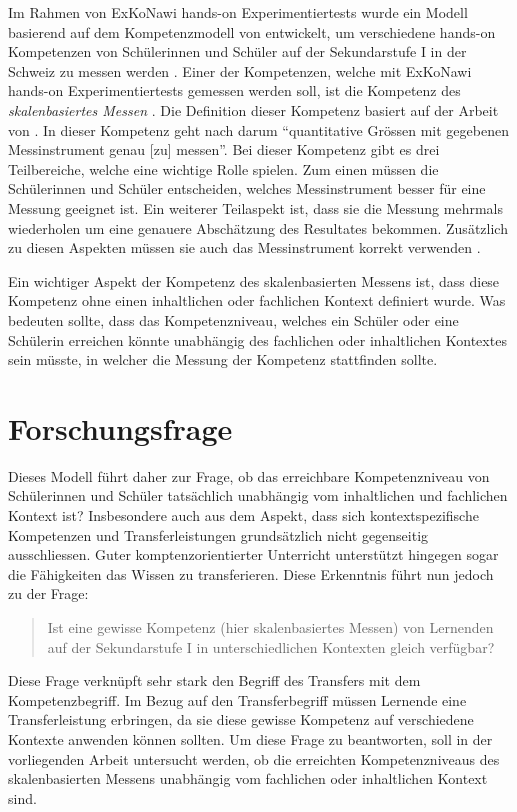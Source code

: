 Im Rahmen von ExKoNawi hands-on Experimentiertests wurde ein Modell basierend auf dem Kompetenzmodell von \citet{Gott1996} entwickelt, um verschiedene hands-on Kompetenzen von Schülerinnen und Schüler auf der Sekundarstufe I in der Schweiz zu messen werden \citep{Metzger2013}. Einer der Kompetenzen, welche mit ExKoNawi hands-on Experimentiertests gemessen werden soll, ist die Kompetenz des \textit{skalenbasiertes Messen} \citep{Gut2013a}. Die Definition dieser Kompetenz basiert auf der Arbeit von \citet{Munier2013}. In dieser Kompetenz geht nach \citep{Gut2013a} darum "`quantitative Grössen mit gegebenen Messinstrument genau [zu] messen"'. Bei dieser Kompetenz gibt es drei Teilbereiche, welche eine wichtige Rolle spielen. Zum einen müssen die Schülerinnen und Schüler entscheiden, welches Messinstrument besser für eine Messung geeignet ist. Ein weiterer Teilaspekt ist, dass sie die Messung mehrmals wiederholen um eine genauere Abschätzung des Resultates bekommen. Zusätzlich zu diesen Aspekten müssen sie auch das Messinstrument korrekt verwenden \citep{Munier2013,Gut2013a}.

Ein wichtiger Aspekt der Kompetenz des skalenbasierten Messens ist, dass diese Kompetenz ohne einen inhaltlichen oder fachlichen Kontext definiert wurde. Was bedeuten sollte, dass das Kompetenzniveau, welches ein Schüler oder eine Schülerin erreichen könnte unabhängig des fachlichen oder inhaltlichen Kontextes sein müsste, in welcher die Messung der Kompetenz stattfinden sollte.

\section{Forschungsfrage}

Dieses Modell führt daher zur Frage, ob das erreichbare Kompetenzniveau von Schüler\-innen und Schüler tatsächlich unabhängig vom inhaltlichen und fachlichen Kontext ist? Insbesondere auch aus dem Aspekt, dass sich kontextspezifische Kompetenzen und Transferleistungen grundsätzlich nicht gegenseitig ausschliessen. Guter komptenzorientierter Unterricht unterstützt hingegen sogar die Fähigkeiten das Wissen zu transferieren. Diese Erkenntnis führt nun jedoch zu der Frage: 
\begin{quote}
Ist eine gewisse Kompetenz (hier skalenbasiertes Messen) von Lernenden auf der Sekundarstufe I in unterschiedlichen Kontexten gleich verfügbar?
\end{quote}

Diese Frage verknüpft sehr stark den Begriff des Transfers mit dem Kompetenzbegriff. Im
Bezug auf den Transferbegriff müssen Lernende eine Transferleistung erbringen, da sie
diese gewisse Kompetenz auf verschiedene Kontexte anwenden können sollten. Um diese Frage zu beantworten, soll in der vorliegenden Arbeit untersucht werden, ob die erreichten Kompetenzniveaus des skalenbasierten Messens unabhängig vom fachlichen oder inhaltlichen Kontext sind.



